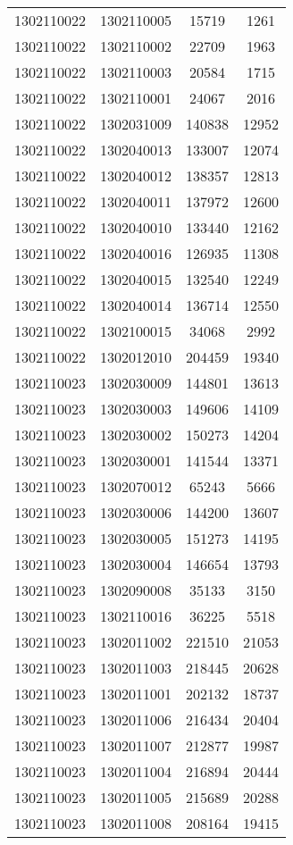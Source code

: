 \begin{longtable}{llcc}
1302110022 & 1302110005 & 15719 & 1261\\
1302110022 & 1302110002 & 22709 & 1963\\
1302110022 & 1302110003 & 20584 & 1715\\
1302110022 & 1302110001 & 24067 & 2016\\
1302110022 & 1302031009 & 140838 & 12952\\
1302110022 & 1302040013 & 133007 & 12074\\
1302110022 & 1302040012 & 138357 & 12813\\
1302110022 & 1302040011 & 137972 & 12600\\
1302110022 & 1302040010 & 133440 & 12162\\
1302110022 & 1302040016 & 126935 & 11308\\
1302110022 & 1302040015 & 132540 & 12249\\
1302110022 & 1302040014 & 136714 & 12550\\
1302110022 & 1302100015 & 34068 & 2992\\
1302110022 & 1302012010 & 204459 & 19340\\
1302110023 & 1302030009 & 144801 & 13613\\
1302110023 & 1302030003 & 149606 & 14109\\
1302110023 & 1302030002 & 150273 & 14204\\
1302110023 & 1302030001 & 141544 & 13371\\
1302110023 & 1302070012 & 65243 & 5666\\
1302110023 & 1302030006 & 144200 & 13607\\
1302110023 & 1302030005 & 151273 & 14195\\
1302110023 & 1302030004 & 146654 & 13793\\
1302110023 & 1302090008 & 35133 & 3150\\
1302110023 & 1302110016 & 36225 & 5518\\
1302110023 & 1302011002 & 221510 & 21053\\
1302110023 & 1302011003 & 218445 & 20628\\
1302110023 & 1302011001 & 202132 & 18737\\
1302110023 & 1302011006 & 216434 & 20404\\
1302110023 & 1302011007 & 212877 & 19987\\
1302110023 & 1302011004 & 216894 & 20444\\
1302110023 & 1302011005 & 215689 & 20288\\
1302110023 & 1302011008 & 208164 & 19415\\

\end{longtable}
